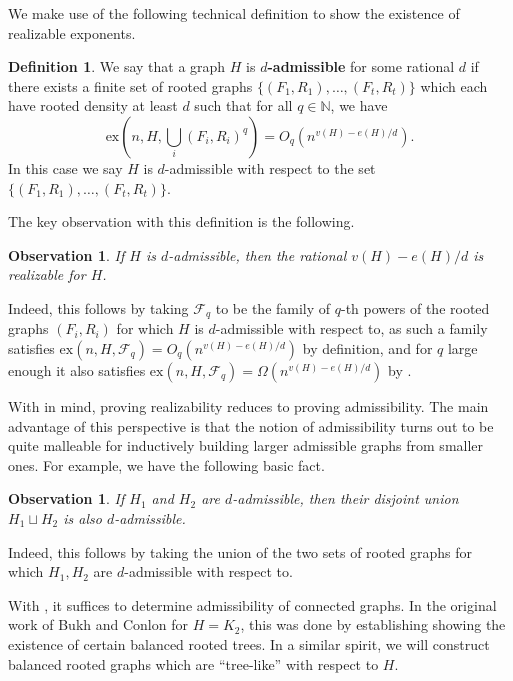 \documentclass[12pt,letterpaper]{article}
\newtheorem{observation}[theorem]{Observation}
\theoremstyle{definition}
\newtheorem{definition}{Definition}
\newcommand{\pow}{q} %
\newcommand{\ex}{\mathrm{ex}}
\renewcommand{\c}[1]{\mathcal{#1}}
\begin{document}
	We  make use of the following technical definition to show the existence of realizable exponents.
	\begin{definition}
		We say that a graph $H$ is \textbf{$d$-admissible} for some rational $d$ if there exists a finite set of rooted graphs $\{(F_1,R_1),\ldots,(F_t,R_t)\}$ which each have rooted density at least $d$ such that for all $\pow\in\mathbb{N}$,  we have 
		\[
		\mathrm{ex}(n,H,\bigcup_i(F_i,R_i)^\pow)=O_\pow(n^{v(H)-e(H)/d}).
		\]
		In this case we say $H$ is $d$-admissible with respect to the set $\{(F_1,R_1),\ldots,(F_t,R_t)\}$.
	\end{definition}
	
	The key observation with this definition is the following.
	\begin{observation}\label{observation admissible implies realizable}
		If $H$ is $d$-admissible, then the rational $v(H)-e(H)/d$ is realizable for $H$.
	\end{observation}
	Indeed, this follows by taking $\c{F}_\pow$ to be the family of $\pow$-th powers of the rooted graphs $(F_i,R_i)$ for which $H$ is $d$-admissible with respect to, as such a family satisfies $\ex(n,H,\c{F}_\pow)=O_\pow(n^{v(H)-e(H)/d})$ by definition, and for $\pow$ large enough it also satisfies $\ex(n,H,\c{F}_\pow)=\Omega(n^{v(H)-e(H)/d})$ by .
	
	With  in mind, proving realizability reduces to proving admissibility.  The main advantage of this perspective is that the notion of admissibility turns out to be quite malleable for inductively building larger admissible graphs from smaller ones.  For example, we have the following basic fact.
	
	\begin{observation}\label{observation disjoint union of dadmissible}
		If $H_1$ and $H_2$ are $d$-admissible, then their disjoint union $H_1\sqcup H_2$ is also $d$-admissible.
	\end{observation}
	Indeed, this follows by taking the union of the two sets of rooted graphs for which $H_1,H_2$ are $d$-admissible with respect to. %
	
	
	With , it suffices to determine admissibility of connected graphs.  In the original work of Bukh and Conlon for $H=K_2$, this was done by establishing  showing the existence of certain balanced rooted trees.  In a similar spirit, we will construct balanced rooted graphs which are ``tree-like'' with respect to $H$.
	
\end{document}
